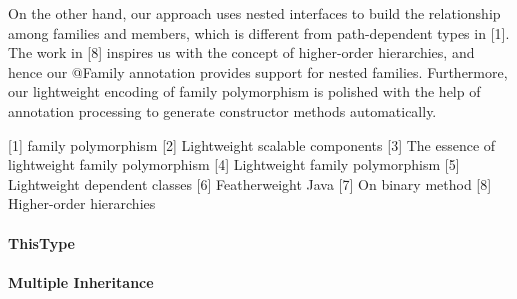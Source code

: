 On the other hand, our approach uses nested interfaces to build the relationship among families and members, which is different from
path-dependent types in [1]. The work in [8] inspires us with the concept of higher-order hierarchies, and hence our \textsf{@Family} annotation
provides support for nested families. Furthermore, our lightweight encoding of family polymorphism is polished with the help of annotation processing
to generate constructor methods automatically.

[1] family polymorphism
[2] Lightweight scalable components
[3] The essence of lightweight family polymorphism
[4] Lightweight family polymorphism
[5] Lightweight dependent classes
[6] Featherweight Java
[7] On binary method
[8] Higher-order hierarchies

\paragraph{ThisType}

\paragraph{Multiple Inheritance}

